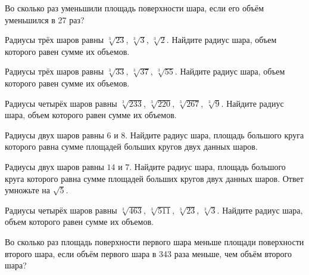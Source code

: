 \documentclass[a4paper]{article}
\begin{document}
\begin{taskBN}{25}
Во сколько раз уменьшили площадь поверхности шара, если его объём уменьшился в 27 раз?
\end{taskBN}

\begin{taskBN}{26}
Радиусы трёх шаров равны $\sqrt[3]{23}$, $\sqrt[3]{3}$, $\sqrt[3]{2}$. Найдите радиус шара, объем которого равен сумме их объемов.
\end{taskBN}

\begin{taskBN}{27}
Радиусы трёх шаров равны $\sqrt[3]{33}$, $\sqrt[3]{37}$, $\sqrt[3]{55}$. Найдите радиус шара, объем которого равен сумме их объемов.
\end{taskBN}

\begin{taskBN}{28}
Радиусы четырёх шаров равны $\sqrt[3]{233}$, $\sqrt[3]{220}$, $\sqrt[3]{267}$, $\sqrt[3]{9}$. Найдите радиус шара, объем которого равен сумме их объемов.
\end{taskBN}

\begin{taskBN}{29}
Радиусы двух шаров равны $6$ и $8$. Найдите радиус шара, площадь большого круга которого равна сумме площадей больших кругов двух данных шаров.
\end{taskBN}

\begin{taskBN}{30}
Радиусы двух шаров равны $14$ и $7$. Найдите радиус шара, площадь большого круга которого равна сумме площадей больших кругов двух данных шаров. Ответ умножьте на $\sqrt{5}$.
\end{taskBN}

\begin{taskBN}{31}
Радиусы четырёх шаров равны $\sqrt[3]{463}$, $\sqrt[3]{511}$, $\sqrt[3]{23}$, $\sqrt[3]{3}$. Найдите радиус шара, объем которого равен сумме их объемов.
\end{taskBN}

\begin{taskBN}{32}
Во сколько раз площадь поверхности первого шара меньше площади поверхности второго шара, если объём первого шара в 343 раза меньше, чем объём второго шара?
\end{taskBN}
\end{document}

